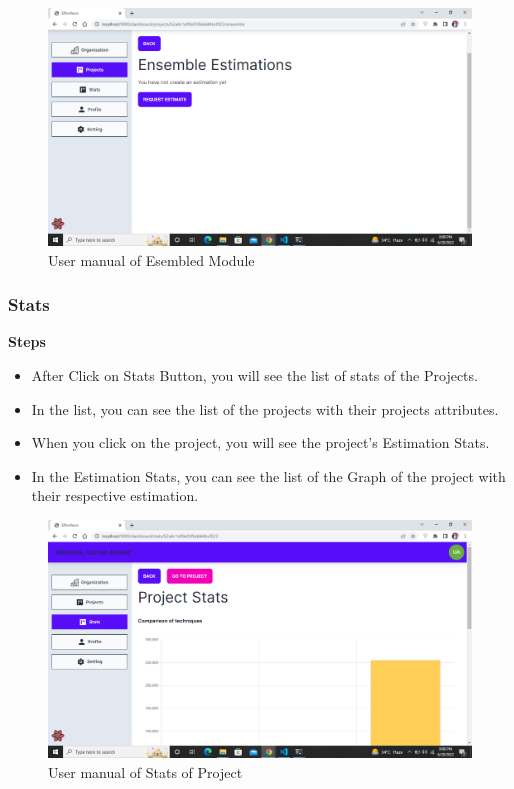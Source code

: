 \begin{figure}[H]
    \centering
    \includegraphics[scale=0.4]{./diagrams/user-manual/Screenshot (36).png}
    \caption{User manual of Esembled Module }
    \label{fig:user-1}

\end{figure}

\subsubsection{Stats}
\textbf{Steps}
\begin{itemize}
    \item  After Click on Stats Button, you will see the list of stats of the Projects.
    \item  In the list, you can see the list of the projects with their projects attributes.
    \item  When you click on the project, you will see the project's Estimation Stats.
    \item  In the Estimation Stats, you can see the list of the Graph of the project with their respective estimation.
\end{itemize}

\begin{figure}[H]
    \centering
    \includegraphics[scale=0.4]{./diagrams/user-manual/Screenshot (26).png}
    \caption{User manual of Stats of Project}
    \label{fig:user-1}

\end{figure}

